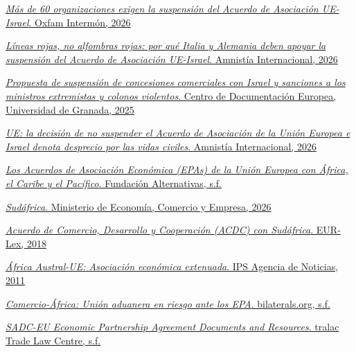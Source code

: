 \documentclass[10pt,a4paper]{article}
\begin{document}
\href{https://www.oxfamintermon.org/es/nota-de-prensa/60-organizaciones-exigen-suspension-acuerdo-asociacion-ue-israel}{\textit{Más de 60 organizaciones exigen la suspensión del Acuerdo de Asociación UE-Israel}. Oxfam Intermón, 2026}

\href{https://www.amnesty.org/es/latest/campaigns/2026/05/eu-israel-trade-agreement/}{\textit{Líneas rojas, no alfombras rojas: por qué Italia y Alemania deben apoyar la suspensión del Acuerdo de Asociación UE-Israel}. Amnistía Internacional, 2026}

\href{https://cde.ugr.es/index.php/union-europea/noticias-ue/2033-propuesta-de-suspension-de-concesiones-comerciales-con-israel-y-sanciones-a-los-ministros-extremistas-y-colonos-violentos}{\textit{Propuesta de suspensión de concesiones comerciales con Israel y sanciones a los ministros extremistas y colonos violentos}. Centro de Documentación Europea, Universidad de Granada, 2025}

\href{https://www.amnesty.org/es/latest/news/2026/04/eu-failure-to-suspend-eu-israel-association-agreement-shows-contempt-for-civilian-lives/}{\textit{UE: la decisión de no suspender el Acuerdo de Asociación de la Unión Europea e Israel denota desprecio por las vidas civiles}. Amnistía Internacional, 2026}

\href{https://fundacionalternativas.org/wp-content/uploads/2022/07/xmlimport-IbjEJY.pdf}{\textit{Los Acuerdos de Asociación Económica (EPAs) de la Unión Europea con África, el Caribe y el Pacífico}. Fundación Alternativas, s.f.}

\href{https://comercio.gob.es/PoliticaComercialUE/AcuerdosComerciales/Paginas/sudafrica.aspx}{\textit{Sudáfrica}. Ministerio de Economía, Comercio y Empresa, 2026}

\href{https://eur-lex.europa.eu/ES/legal-content/summary/trade-development-and-cooperation-agreement-tdca-with-south-africa.html?fromSummary=07}{\textit{Acuerdo de Comercio, Desarrollo y Cooperación (ACDC) con Sudáfrica}. EUR-Lex, 2018}

\href{https://ipsnoticias.net/2011/08/africa-austral-ue-asociacion-economica-extenuada/}{\textit{África Austral-UE: Asociación económica extenuada}. IPS Agencia de Noticias, 2011}

\href{https://www.bilaterals.org/?comercio-africa-union-aduanera-en&lang=en}{\textit{Comercio-África: Unión aduanera en riesgo ante los EPA}. bilaterals.org, s.f.}

\href{https://www.tralac.org/resources/our-resources/12127-sadc-eu-economic-partnership-agreement-documents-and-resources.html}{\textit{SADC-EU Economic Partnership Agreement Documents and Resources}. tralac Trade Law Centre, s.f.}
\end{document}
